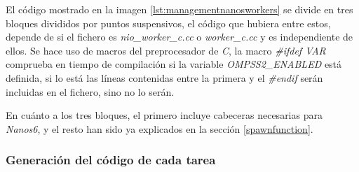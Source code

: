 El código mostrado en la imagen \ref{lst:managementnanosworkers} se divide en tres bloques divididos por puntos suspensivos, el código que hubiera entre estos, depende de si el fichero es \textit{nio\_worker\_c.cc} o \textit{worker\_c.cc} y es independiente de ellos. Se hace uso de macros del preprocesador de \textit{C}, la macro \textit{\#ifdef VAR} comprueba en tiempo de compilación si la variable \textit{OMPSS2\_ENABLED} está definida, si lo está las líneas contenidas entre la primera y el \textit{\#endif} serán incluidas en el fichero, sino no lo serán.
\par\medskip

En cuánto a los tres bloques, el primero incluye cabeceras necesarias para \textit{Nanos6}, y el resto han sido ya explicados en la sección \ref{spawnfunction}.

\subsubsection{Generación del código de cada tarea}

